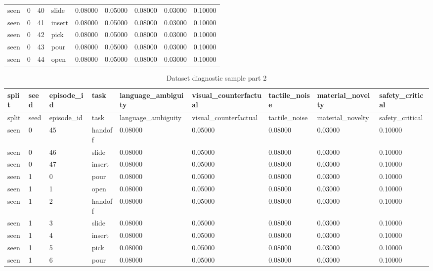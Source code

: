 \documentclass{article}
\begin{document}
\begin{center}
\begin{longtable}{lllllllll}
seen & 0 & 40 & slide & 0.08000 & 0.05000 & 0.08000 & 0.03000 & 0.10000 \\
seen & 0 & 41 & insert & 0.08000 & 0.05000 & 0.08000 & 0.03000 & 0.10000 \\
seen & 0 & 42 & pick & 0.08000 & 0.05000 & 0.08000 & 0.03000 & 0.10000 \\
seen & 0 & 43 & pour & 0.08000 & 0.05000 & 0.08000 & 0.03000 & 0.10000 \\
seen & 0 & 44 & open & 0.08000 & 0.05000 & 0.08000 & 0.03000 & 0.10000 \\
\bottomrule
\end{longtable}
\renewcommand{\arraystretch}{1.0}
\end{center}


\begin{center}
\tiny
\renewcommand{\arraystretch}{0.92}
\setlength{\tabcolsep}{3pt}
\begin{longtable}{lllllllll}
\caption{Dataset diagnostic sample part 2}\label{tab:dataset-diagnostic-sample-2}\\
\toprule
split & seed & episode\_id & task & language\_ambiguity & visual\_counterfactual & tactile\_noise & material\_novelty & safety\_critical \\
\midrule
\endfirsthead
\toprule
split & seed & episode\_id & task & language\_ambiguity & visual\_counterfactual & tactile\_noise & material\_novelty & safety\_critical \\
\midrule
\endhead
seen & 0 & 45 & handoff & 0.08000 & 0.05000 & 0.08000 & 0.03000 & 0.10000 \\
seen & 0 & 46 & slide & 0.08000 & 0.05000 & 0.08000 & 0.03000 & 0.10000 \\
seen & 0 & 47 & insert & 0.08000 & 0.05000 & 0.08000 & 0.03000 & 0.10000 \\
seen & 1 & 0 & pour & 0.08000 & 0.05000 & 0.08000 & 0.03000 & 0.10000 \\
seen & 1 & 1 & open & 0.08000 & 0.05000 & 0.08000 & 0.03000 & 0.10000 \\
seen & 1 & 2 & handoff & 0.08000 & 0.05000 & 0.08000 & 0.03000 & 0.10000 \\
seen & 1 & 3 & slide & 0.08000 & 0.05000 & 0.08000 & 0.03000 & 0.10000 \\
seen & 1 & 4 & insert & 0.08000 & 0.05000 & 0.08000 & 0.03000 & 0.10000 \\
seen & 1 & 5 & pick & 0.08000 & 0.05000 & 0.08000 & 0.03000 & 0.10000 \\
seen & 1 & 6 & pour & 0.08000 & 0.05000 & 0.08000 & 0.03000 & 0.10000 \\

\end{longtable}
\end{center}
\end{document}
